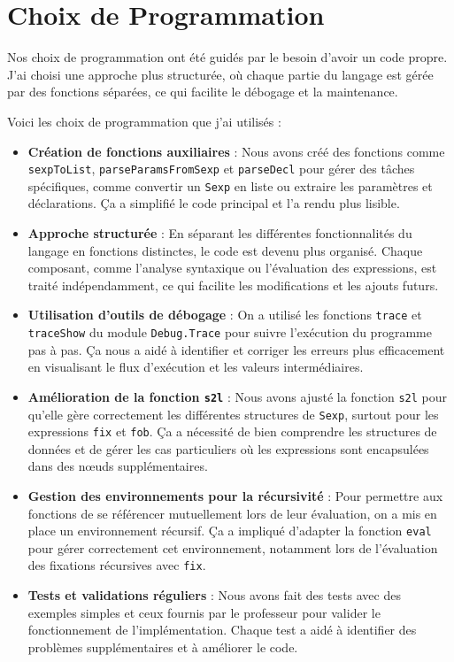 \documentclass[a4paper,12pt]{article}
\begin{document}
\section{Choix de Programmation}

Nos choix de programmation ont été guidés par le besoin d'avoir un code propre. J'ai choisi une approche plus structurée, où chaque partie du langage est gérée par des fonctions séparées, ce qui facilite le débogage et la maintenance.

Voici les choix de programmation que j'ai utilisés :

\begin{itemize}
    \item \textbf{Création de fonctions auxiliaires} : Nous avons créé des fonctions comme \texttt{sexpToList}, \texttt{parseParamsFromSexp} et \texttt{parseDecl} pour gérer des tâches spécifiques, comme convertir un \texttt{Sexp} en liste ou extraire les paramètres et déclarations. Ça a simplifié le code principal et l'a rendu plus lisible.

    \item \textbf{Approche structurée} : En séparant les différentes fonctionnalités du langage en fonctions distinctes, le code est devenu plus organisé. Chaque composant, comme l'analyse syntaxique ou l'évaluation des expressions, est traité indépendamment, ce qui facilite les modifications et les ajouts futurs.

    \item \textbf{Utilisation d'outils de débogage} : On a utilisé les fonctions \texttt{trace} et \texttt{traceShow} du module \texttt{Debug.Trace} pour suivre l'exécution du programme pas à pas. Ça nous a aidé à identifier et corriger les erreurs plus efficacement en visualisant le flux d'exécution et les valeurs intermédiaires.

    \item \textbf{Amélioration de la fonction \texttt{s2l}} : Nous avons ajusté la fonction \texttt{s2l} pour qu'elle gère correctement les différentes structures de \texttt{Sexp}, surtout pour les expressions \texttt{fix} et \texttt{fob}. Ça a nécessité de bien comprendre les structures de données et de gérer les cas particuliers où les expressions sont encapsulées dans des nœuds supplémentaires.

    \item \textbf{Gestion des environnements pour la récursivité} : Pour permettre aux fonctions de se référencer mutuellement lors de leur évaluation, on a mis en place un environnement récursif. Ça a impliqué d'adapter la fonction \texttt{eval} pour gérer correctement cet environnement, notamment lors de l'évaluation des fixations récursives avec \texttt{fix}.

    \item \textbf{Tests et validations réguliers} : Nous avons fait des tests avec des exemples simples et ceux fournis par le professeur pour valider le fonctionnement de l'implémentation. Chaque test a aidé à identifier des problèmes supplémentaires et à améliorer le code.
\end{itemize}
\end{document}
